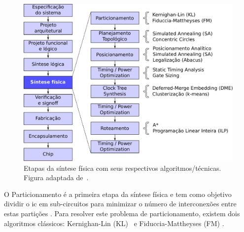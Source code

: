 \begin{figure}[!b]
    \centering
    \includegraphics[width=\textwidth]{img/caracterizacao/exemplo_fluxo_com_algoritmos.pdf}
    \caption[Etapas da síntese física]{Etapas da síntese física com seus respectivos algoritmos/técnicas. Figura adaptada de~.}
    \label{fig:exemplo_fluxo_com_algoritmos}
\end{figure}

O Particionamento é a primeira etapa da síntese física e tem como objetivo dividir o \ac{ic} em sub-circuitos para minimizar o número de interconexões entre estas partições \cite{kahng2011vlsi}. Para resolver este problema de particionamento, existem dois algoritmos clássicos: Kernighan-Lin (KL)~\cite{kernighan1970efficient} e Fiduccia-Mattheyses (FM) \cite{fiduccia1988linear}.



